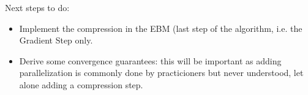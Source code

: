 \documentclass{article}
\begin{document}
Next steps to do:
\begin{itemize}
\item Implement the compression in the EBM (last step of the algorithm, i.e. the Gradient Step only.
\item Derive some convergence guarantees: this will be important as adding parallelization is commonly done by practicioners but never understood, let alone adding a compression step.
\end{itemize}




\end{document}
